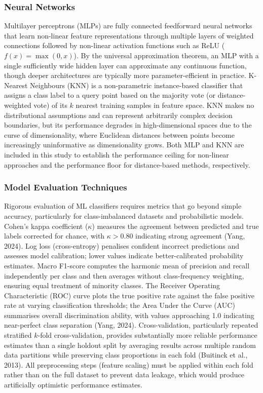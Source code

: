 \documentclass[12pt, oneside]{article} %
\begin{document}
\subsubsection{Neural Networks}

Multilayer perceptrons (MLPs) are fully connected feedforward neural networks that learn non-linear feature representations through multiple layers of weighted connections followed by non-linear activation functions such as ReLU ($f(x) = \max(0, x)$). By the universal approximation theorem, an MLP with a single sufficiently wide hidden layer can approximate any continuous function, though deeper architectures are typically more parameter-efficient in practice. K-Nearest Neighbours (KNN) is a non-parametric instance-based classifier that assigns a class label to a query point based on the majority vote (or distance-weighted vote) of its $k$ nearest training samples in feature space. KNN makes no distributional assumptions and can represent arbitrarily complex decision boundaries, but its performance degrades in high-dimensional spaces due to the curse of dimensionality, where Euclidean distances between points become increasingly uninformative as dimensionality grows. Both MLP and KNN are included in this study to establish the performance ceiling for non-linear approaches and the performance floor for distance-based methods, respectively.


\subsubsection{Model Evaluation Techniques}

Rigorous evaluation of ML classifiers requires metrics that go beyond simple accuracy, particularly for class-imbalanced datasets and probabilistic models. Cohen's kappa coefficient ($\kappa$) measures the agreement between predicted and true labels corrected for chance, with $\kappa > 0.80$ indicating strong agreement (Yang, 2024). Log loss (cross-entropy) penalises confident incorrect predictions and assesses model calibration; lower values indicate better-calibrated probability estimates. Macro F1-score computes the harmonic mean of precision and recall independently per class and then averages without class-frequency weighting, ensuring equal treatment of minority classes. The Receiver Operating Characteristic (ROC) curve plots the true positive rate against the false positive rate at varying classification thresholds; the Area Under the Curve (AUC) summarises overall discrimination ability, with values approaching 1.0 indicating near-perfect class separation (Yang, 2024). Cross-validation, particularly repeated stratified $k$-fold cross-validation, provides substantially more reliable performance estimates than a single holdout split by averaging results across multiple random data partitions while preserving class proportions in each fold (Buitinck et al., 2013). All preprocessing steps (feature scaling) must be applied within each fold rather than on the full dataset to prevent data leakage, which would produce artificially optimistic performance estimates.
\end{document}
